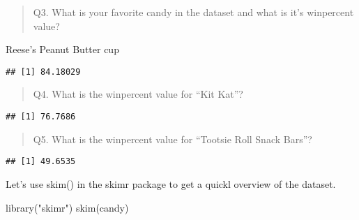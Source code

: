 \documentclass[
]{article}
\newenvironment{Shaded}{\begin{snugshade}}{\end{snugshade}}
\newcommand{\FunctionTok}[1]{\textcolor[rgb]{0.00,0.00,0.00}{#1}}
\newcommand{\NormalTok}[1]{#1}
\newcommand{\SpecialCharTok}[1]{\textcolor[rgb]{0.00,0.00,0.00}{#1}}
\newcommand{\StringTok}[1]{\textcolor[rgb]{0.31,0.60,0.02}{#1}}
\begin{document}
\begin{quote}
Q3. What is your favorite candy in the dataset and what is it's
winpercent value?
\end{quote}

Reese's Peanut Butter cup

\begin{Shaded}
\end{Shaded}

\begin{verbatim}
## [1] 84.18029
\end{verbatim}

\begin{quote}
Q4. What is the winpercent value for ``Kit Kat''?
\end{quote}

\begin{Shaded}
\end{Shaded}

\begin{verbatim}
## [1] 76.7686
\end{verbatim}

\begin{quote}
Q5. What is the winpercent value for ``Tootsie Roll Snack Bars''?
\end{quote}

\begin{Shaded}
\end{Shaded}

\begin{verbatim}
## [1] 49.6535
\end{verbatim}

Let's use skim() in the skimr package to get a quickl overview of the
dataset.

\begin{Shaded}
\begin{Highlighting}[]
\FunctionTok{library}\NormalTok{(}\StringTok{"skimr"}\NormalTok{)}
\FunctionTok{skim}\NormalTok{(candy)}
\end{Highlighting}
\end{Shaded}
\end{document}
